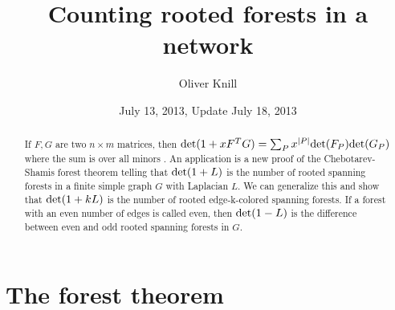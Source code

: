 \documentclass[12pt]{amsart}
\title{Counting rooted forests in a network}
\author{Oliver Knill}
\date{July 13, 2013, Update July 18, 2013}
\theoremstyle{definition}
\begin{document}
\maketitle
\begin{abstract}
If $F,G$ are two $n \times m$ matrices, then ${{\rm det}}(1+x F^T G) = \sum_P x^{|P|} {{\rm det}}(F_P) {{\rm det}}(G_P)$ 
where the sum is over all minors \cite{cauchybinet}. An application is a new proof of the
Chebotarev-Shamis forest theorem telling that ${{\rm det}}(1+L)$ is the number of rooted 
spanning forests in a finite simple graph $G$ with Laplacian $L$. We can generalize this and show
that ${{\rm det}}(1+k L)$ is the number of rooted edge-k-colored spanning forests.  If a forest with an even number
of edges is called even, then ${{\rm det}}(1-L)$ is the difference between even and odd rooted spanning 
forests in $G$. 
\end{abstract} 

\section{The forest theorem}
\end{document}
